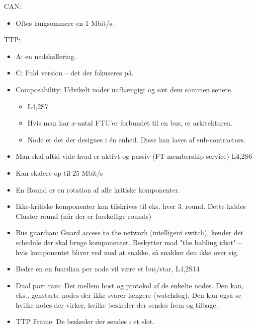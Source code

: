 \documentclass[oneside, 10pt]{article}
\begin{document}
CAN:
\begin{itemize}
	\item Oftes langsommere en 1 Mbit/s.
\end{itemize}

TTP:
\begin{itemize}
	\item A: en nedskallering.
	\item C: Fuld version -- det der fokuseres på.
	\item Composability: Udvikelt noder uafhængigt og sæt dem sammen senere.
	\begin{itemize}
		\item L4,2S7
		\item Hvis man har $x$-antal FTU'er forbundet til en bus, er arkitekturen.
		\item Node er det der designes i én enhed. Disse kan laves af sub-contractors.
	\end{itemize}
	\item Man skal altid vide hvad er aktivt og passiv (FT membership service) L4,2S6
	\item Kan skalere op til 25 Mbit/s
	\item En Round er en rotation af alle kritiske komponenter.
	\item Ikke-kritiske komponenter kan tilskrives til eks. hver 3. round. Dette kaldes Cluster round (når der er forskellige rounds)
	\item Bus guardian: Guard access to the network (intelligent switch), kender det schedule der skal bruge komponentet. Beskytter mod "the babling idiot" -- hvis komponentet bliver ved med at snakke, så snakker den ikke over sig.
	\item Bedre en en fuardian per node vil være et bus/star, L4,2S14

	\item Dual port ram: Det mellem host og protokol af de enkelte nodes. Den kan, eks., genstarte nodes der ikke svarer længere (watchdog). Den kan også se hvilke notes der virker, hvilke beskeder der sendes frem og tilbage.
	\item TTP Frame: De beskeder der sendes i et slot.
\end{itemize}
\end{document}
